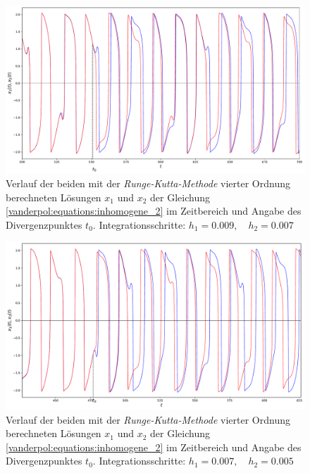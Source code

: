 \begin{figure}
\includegraphics[width=\textwidth]{papers/vanderpol/figures/RK_schritt_delta_2e-3_2.pdf}
\caption{Verlauf der beiden mit der {\em Runge-Kutta-Methode} vierter Ordnung berechneten Lösungen $x_1$ und $x_2$ der Gleichung \eqref{vanderpol:equations:inhomogene_2} im Zeitbereich und Angabe des Divergenzpunktes $t_0$. Integrationsschritte: $h_1 = 0.009, \quad h_2 = 0.007$\label{vanderpol:figures:RK_schritt_2e-3}}
\end{figure}

\begin{figure}
\includegraphics[width=\textwidth]{papers/vanderpol/figures/RK_schritt_delta_2e-3.pdf}
\caption{Verlauf der beiden mit der {\em Runge-Kutta-Methode} vierter Ordnung berechneten Lösungen $x_1$ und $x_2$ der Gleichung \eqref{vanderpol:equations:inhomogene_2} im Zeitbereich und Angabe des Divergenzpunktes $t_0$. Integrationsschritte: $h_1 = 0.007, \quad h_2 = 0.005$\label{vanderpol:figures:RK_schritt_2e-3_2}}
\end{figure}

